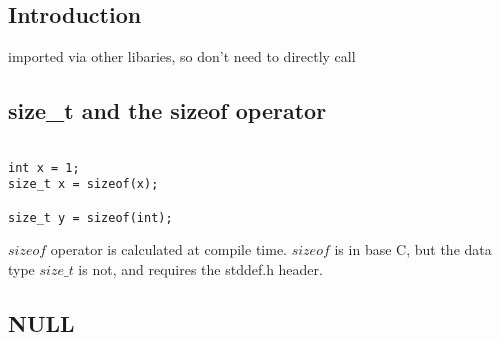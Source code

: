 
\subsection{Introduction}

imported via other libaries, so don't need to directly call


\subsection{size\_t and the sizeof operator}

\begin{verbatim}

int x = 1;
size_t x = sizeof(x);

size_t y = sizeof(int);
\end{verbatim}


\(sizeof\) operator is calculated at compile time. \(sizeof\) is in base C, but the data type \(size\_t\) is not, and requires the stddef.h header.

\subsection{NULL}

